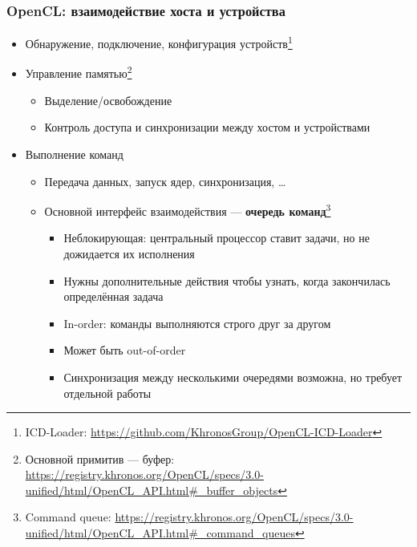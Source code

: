 \documentclass[xcolor=table,aspectratio=169]{beamer}
\begin{document}
\begin{frame}[fragile]
  \frametitle{OpenCL: взаимодействие хоста и устройства}
  \begin{itemize}
    \item Обнаружение, подключение, конфигурация устройств\footnote{ICD-Loader: \url{https://github.com/KhronosGroup/OpenCL-ICD-Loader}}
    \item Управление памятью\footnote{Основной примитив --- буфер: \url{https://registry.khronos.org/OpenCL/specs/3.0-unified/html/OpenCL_API.html\#_buffer_objects}}
    \begin{itemize}
      \item Выделение/освобождение
      \item Контроль доступа и синхронизации между хостом и устройствами
    \end{itemize} 
    \item Выполнение команд 
    \begin{itemize}
      \item Передача данных, запуск ядер, синхронизация, \ldots
      \item Основной интерфейс взаимодействия --- \textbf{очередь команд}\footnote{Command queue: \url{https://registry.khronos.org/OpenCL/specs/3.0-unified/html/OpenCL_API.html\#_command_queues}}
      \begin{itemize}
        \item Неблокирующая: центральный процессор ставит задачи, но не дожидается их исполнения
        \item Нужны дополнительные действия чтобы узнать, когда закончилась определённая задача
        \item In-order: команды выполняются строго друг за другом
        \item Может быть out-of-order
        \item Синхронизация между несколькими очередями возможна, но требует отдельной работы
      \end{itemize}
    \end{itemize} 
  \end{itemize}

\end{frame}
\end{document}
